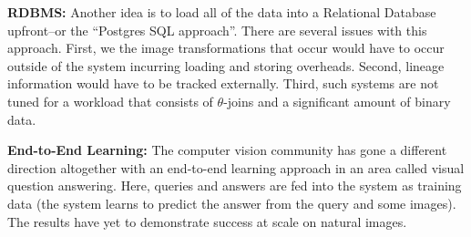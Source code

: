 \vspace{0.5em} \noindent \textbf{RDBMS: } Another idea is to load all of the data into a Relational Database upfront--or the ``Postgres SQL approach''. There are several issues with this approach. First, we the image transformations that occur would have to occur outside of the system incurring loading and storing overheads. Second, lineage information would have to be tracked externally. Third, such systems are not tuned for a workload that consists of $\theta$-joins and a significant amount of binary data.

\vspace{0.5em}  \noindent \textbf{End-to-End Learning: } The computer vision community has gone a different direction altogether with an end-to-end learning approach in an area called visual question answering. Here, queries and answers are fed into the system as training data (the system learns to predict the answer from the query and some images). The results have yet to demonstrate success at scale on natural images. 









